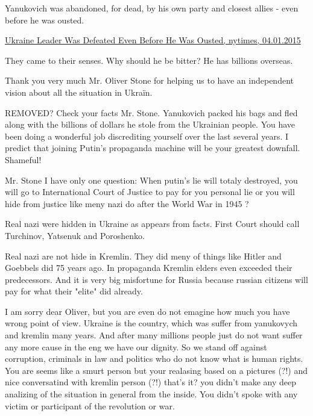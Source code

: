 \begin{itemize}
\begin{itemize}

Yanukovich was abandoned, for dead, by his own party and closest allies - even
before he was ousted.

\href{https://www.nytimes.com/2015/01/04/world/europe/ukraine-leader-was-defeated-even-before-he-was-ousted.html}{%
Ukraine Leader Was Defeated Even Before He Was Ousted, nytimes, 04.01.2015%
}

They came to their senses. Why should he be bitter? He has billions overseas.


\end{itemize} %


Thank you very much Mr. Oliver Stone for helping us to have an independent
vision about all the situation in Ukraïn.



REMOVED? Check your facts Mr. Stone. Yanukovich packed his bags and fled along
with the billions of dollars he stole from the Ukrainian people. You have been
doing a wonderful job discrediting yourself over the last several years. I
predict that joining Putin's propaganda machine will be your greatest downfall.
Shameful!



Mr. Stone I have only one question: When putin's lie will totaly destroyed, you
will go to International Court of Justice to pay for you personal lie or you
will hide from justice like meny nazi do after the World War in 1945 ?

\begin{itemize} %
Real nazi were hidden in Ukraine as appears from facts. First Court should call Turchinov, Yatsenuk and Poroshenko.


Real nazi are not hide in Kremlin. They did meny of things like Hitler and
Goebbels did 75 years ago. In propaganda Kremlin elders even exceeded their
predecessors. And it is very big misfortune for Russia because russian citizens
will pay for what their "elite" did already.

\end{itemize} %


I am sorry dear Oliver, but you are even do not emagine how much you have wrong
point of view. Ukraine is the country, which was suffer from yanukovych and
kremlin many years. And after many millions people just do not want suffer any
more cause in the eng we have our dignity. So we stand off against corruption,
criminals in law and politics who do not know what is human rights. You are
seems like a smurt person but your realasing based on a pictures (?!) and nice
conversatind with kremlin person (?!) that's it? you didn't make any deep
analizing of the situation in general from the inside. You didn't spoke with
any victim or participant of the revolution or war. 


\end{itemize}
